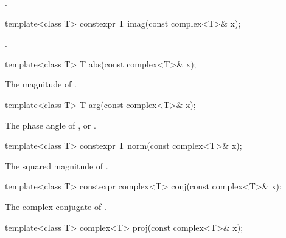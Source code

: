 \begin{itemdescr}
\pnum
\returns
{}.
\end{itemdescr}

%
\begin{itemdecl}
template<class T> constexpr T imag(const complex<T>& x);
\end{itemdecl}

\begin{itemdescr}
\pnum
\returns
{}.
\end{itemdescr}

%
\begin{itemdecl}
template<class T> T abs(const complex<T>& x);
\end{itemdecl}

\begin{itemdescr}
\pnum
\returns
The magnitude of .
\end{itemdescr}

%
\begin{itemdecl}
template<class T> T arg(const complex<T>& x);
\end{itemdecl}

\begin{itemdescr}
\pnum
\returns
The phase angle of , or .
\end{itemdescr}

%
\begin{itemdecl}
template<class T> constexpr T norm(const complex<T>& x);
\end{itemdecl}

\begin{itemdescr}
\pnum
\returns
The squared magnitude of .
\end{itemdescr}

%
\begin{itemdecl}
template<class T> constexpr complex<T> conj(const complex<T>& x);
\end{itemdecl}

\begin{itemdescr}
\pnum
\returns
The complex conjugate of .
\end{itemdescr}

%
\begin{itemdecl}
template<class T> complex<T> proj(const complex<T>& x);
\end{itemdecl}

